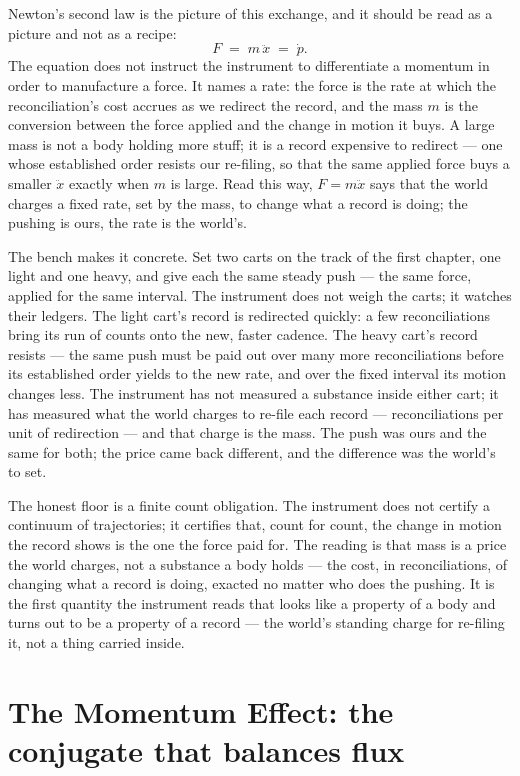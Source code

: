 Newton's second law is the picture of this exchange, and it should be read as a picture and not as a recipe:
\begin{equation}
  F \;=\; m\,\ddot{x} \;=\; \dot{p}.
\end{equation}
The equation does not instruct the instrument to differentiate a momentum in order to manufacture a force. It
names a rate: the force is the rate at which the reconciliation's cost accrues as we redirect the record, and
the mass $m$ is the conversion between the force applied and the change in motion it buys. A large mass is not
a body holding more stuff; it is a record expensive to redirect --- one whose established order resists our
re-filing, so that the same applied force buys a smaller $\ddot{x}$ exactly when $m$ is large. Read this way,
$F = m\ddot{x}$ says that the world charges a fixed rate, set by the mass, to change what a record is doing;
the pushing is ours, the rate is the world's.

The bench makes it concrete. Set two carts on the track of the first chapter, one light and one heavy, and
give each the same steady push --- the same force, applied for the same interval. The instrument does not
weigh the carts; it watches their ledgers. The light cart's record is redirected quickly: a few
reconciliations bring its run of counts onto the new, faster cadence. The heavy cart's record resists --- the
same push must be paid out over many more reconciliations before its established order yields to the new rate,
and over the fixed interval its motion changes less. The instrument has not measured a substance inside either
cart; it has measured what the world charges to re-file each record --- reconciliations per unit of
redirection --- and that charge is the mass. The push was ours and the same for both; the price came back
different, and the difference was the world's to set.

The honest floor is a finite count obligation. The instrument does not certify a continuum of trajectories;
it certifies that, count for count, the change in motion the record shows is the one the force paid for. The
reading is that mass is a price the world charges, not a substance a body holds --- the cost, in
reconciliations, of changing what a record is doing, exacted no matter who does the pushing. It is the first
quantity the instrument reads that looks like a property of a body and turns out to be a property of a record
--- the world's standing charge for re-filing it, not a thing carried inside.

\section{The Momentum Effect: the conjugate that balances flux}
\label{se:momentum}

